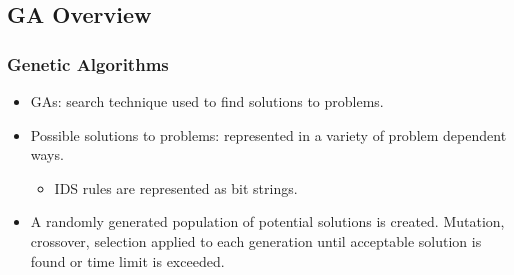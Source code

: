 \documentclass{beamer}
\newcommand{\linespace}{\vskip 0.25cm}
\begin{document}
\subsection{GA Overview}
\begin{frame}
  \frametitle{Genetic Algorithms}
	\begin{itemize}
		\item GAs: search technique used to find solutions to problems.
        \item Possible solutions to problems: represented in a variety of problem dependent ways.
        
        \begin{itemize}
        	\item IDS rules are represented as bit strings.
        \end{itemize}
        
        \linespace
        \item A randomly generated population of potential solutions is created. Mutation, crossover, selection applied to each generation until acceptable solution is found or time limit is exceeded.
	\end{itemize}
\end{frame}
\end{document}
